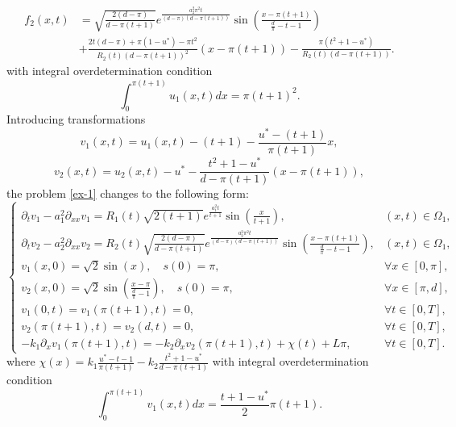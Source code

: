 \documentclass[preprint,12pt,authoryear]{elsarticle}
\begin{document}
\begin{equation}
    \begin{split}
        f_2(x,t)&=\sqrt{\frac{2(d-\pi)}{d-\pi(t+1)}}e^{\frac{a_2^2\pi^2t}{(d-\pi)(d-\pi(t+1))}}\sin\left(\frac{x-\pi(t+1)}{\frac{d}{\pi}-t-1}\right)\\
        &+\frac{2t(d-\pi)+\pi(1-u^*)-\pi t^2}{R_2(t)(d-\pi(t+1))^2}(x-\pi(t+1))-\frac{\pi(t^2+1-u^*)}{R_2(t)(d-\pi(t+1))}.
    \end{split}
\end{equation}
with integral overdetermination condition
\begin{equation}\label{ex-2}
    \int_0^{\pi(t+1)}u_1(x,t)dx=\pi(t+1)^2.
\end{equation}
Introducing transformations
\begin{equation}\label{ex-3}
    v_1(x,t)=u_1(x,t)-(t+1)-\frac{u^*-(t+1)}{\pi(t+1)}x,
\end{equation}
\begin{equation}\label{ex-4}
    v_2(x,t)=u_2(x,t)-u^*-\frac{t^2+1-u^*}{d-\pi(t+1)}(x-\pi(t+1)),
\end{equation}
the problem \eqref{ex-1} changes to the following form:
\begin{equation}\label{ex-5}
    \begin{cases}
        \partial_tv_1-a_1^2\partial_{xx}v_1=R_1(t)\sqrt{2(t+1)}e^{\frac{a_1^2t}{t+1}}\sin\left(\frac{x}{t+1}\right),&(x,t)\in\Omega_1,\\
        \partial_tv_2-a_2^2\partial_{xx}v_2=R_2(t)\sqrt{\frac{2(d-\pi)}{d-\pi(t+1)}}e^{\frac{a_2^2\pi^2t}{(d-\pi)(d-\pi(t+1))}}\sin\left(\frac{x-\pi(t+1)}{\frac{d}{\pi}-t-1}\right),&(x,t)\in\Omega_1,\\
        v_1(x,0)=\sqrt{2}\sin(x),\quad s(0)=\pi,&\forall x\in[0,\pi],\\
        v_2(x,0)=\sqrt{2}\sin\left(\frac{x-\pi}{\frac{d}{\pi}-1}\right),\quad s(0)=\pi,&\forall x\in[\pi,d],\\
        v_1(0,t)=v_1(\pi(t+1),t)=0,&\forall t\in[0,T],\\
        v_2(\pi(t+1),t)=v_2(d,t)=0,&\forall t\in[0,T],\\
        -k_1\partial_xv_1(\pi(t+1),t)=-k_2\partial_x v_2(\pi(t+1),t)+\chi(t)+L\pi,&\forall t\in[0,T].
    \end{cases}
\end{equation}
where $\chi(x)=k_1\frac{u^*-t-1}{\pi(t+1)}-k_2\frac{t^2+1-u^*}{d-\pi(t+1)}$ with integral overdetermination condition
$$\int_0^{\pi(t+1)}v_1(x,t)dx=\frac{t+1-u^*}{2}\pi(t+1).$$
\end{document}
